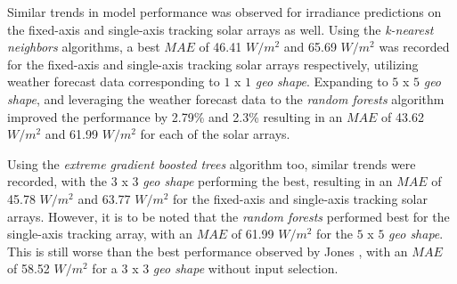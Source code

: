 \par Similar trends in model performance was observed for irradiance predictions on the fixed-axis and single-axis tracking solar arrays as well. Using the \textit{k-nearest neighbors} algorithms, a best $MAE$ of 46.41 $W/m^2$ and 65.69 $W/m^2$ was recorded for the fixed-axis and single-axis tracking solar arrays respectively, utilizing weather forecast data corresponding to $1$ x $1$ \textit{geo shape}. Expanding to $5$ x $5$ \textit{geo shape}, and leveraging the weather forecast data to the \textit{random forests} algorithm improved the performance by 2.79\% and 2.3\% resulting in an $MAE$ of 43.62 $W/m^2$ and 61.99 $W/m^2$ for each of the solar arrays. 

\par Using the \textit{extreme gradient boosted trees} algorithm too, similar trends were recorded, with the $3$ x $3$ \textit{geo shape} performing the best, resulting in an $MAE$ of 45.78 $W/m^2$ and 63.77 $W/m^2$ for the fixed-axis and single-axis tracking solar arrays. However, it is to be noted that the
\textit{random forests} performed best for the single-axis tracking array, with an $MAE$ of 61.99 $W/m^2$ for the $5$ x $5$ \textit{geo shape}. This is still worse than the best performance observed by Jones \cite{thesis_zach}, with an $MAE$ of 58.52 $W/m^2$ for a $3$ x $3$ \textit{geo shape} without input selection.

